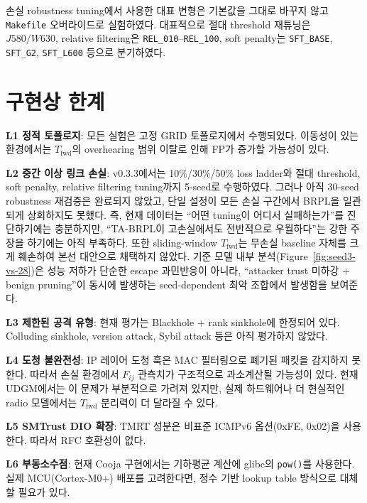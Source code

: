 \documentclass[12pt,a4paper]{article}
\begin{document}
손실 robustness tuning에서 사용한 대표 변형은 기본값을 그대로 바꾸지 않고
\texttt{Makefile} 오버라이드로 실험하였다. 대표적으로 절대 threshold 재튜닝은
$J580/W630$, relative filtering은 \texttt{REL\_010}--\texttt{REL\_100},
soft penalty는 \texttt{SFT\_BASE}, \texttt{SFT\_G2}, \texttt{SFT\_L600} 등으로 분기하였다.

\section{구현상 한계}

\textbf{L1 정적 토폴로지}: 모든 실험은 고정 GRID 토폴로지에서 수행되었다.
이동성이 있는 환경에서는 $T_\text{fwd}$의 overhearing 범위 이탈로 인해
FP가 증가할 가능성이 있다.

\textbf{L2 중간 이상 링크 손실}: v0.3.3에서는 10\%/30\%/50\% loss ladder와
절대 threshold, soft penalty, relative filtering tuning까지 5-seed로 수행하였다.
그러나 아직 30-seed robustness 재검증은 완료되지 않았고,
단일 설정이 모든 손실 구간에서 BRPL을 일관되게 상회하지도 못했다.
즉, 현재 데이터는 ``어떤 tuning이 어디서 실패하는가''를 진단하기에는 충분하지만,
``TA-BRPL이 고손실에서도 전반적으로 우월하다''는 강한 주장을 하기에는 아직 부족하다.
또한 sliding-window $T_\text{fwd}$는 무손실 baseline 자체를 크게 훼손하여
본선 대안으로 채택하지 않았다.
기준 모델 내부 분석(Figure~\ref{fig:seed3-vs-28})은
성능 저하가 단순한 escape 과민반응이 아니라,
``attacker trust 미하강 + benign pruning''이 동시에 발생하는 seed-dependent 최악 조합에서
발생함을 보여준다.

\textbf{L3 제한된 공격 유형}: 현재 평가는 Blackhole + rank sinkhole에 한정되어 있다.
Colluding sinkhole, version attack, Sybil attack 등은 아직 평가하지 않았다.

\textbf{L4 도청 불완전성}: IP 레이어 도청 훅은 MAC 필터링으로 폐기된 패킷을 감지하지 못한다.
따라서 손실 환경에서 $F_{ij}$ 관측치가 구조적으로 과소계산될 가능성이 있다.
현재 UDGM에서는 이 문제가 부분적으로 가려져 있지만, 실제 하드웨어나 더 현실적인 radio 모델에서는
$T_\text{fwd}$ 분리력이 더 달라질 수 있다.

\textbf{L5 SMTrust DIO 확장}: TMRT 성분은 비표준 ICMPv6 옵션(0xFE, 0x02)을 사용한다.
따라서 RFC 호환성이 없다.

\textbf{L6 부동소수점}: 현재 Cooja 구현에서는 기하평균 계산에 glibc의
\texttt{pow()}를 사용한다. 실제 MCU(Cortex-M0+) 배포를 고려한다면,
정수 기반 lookup table 방식으로 대체할 필요가 있다.
\end{document}
